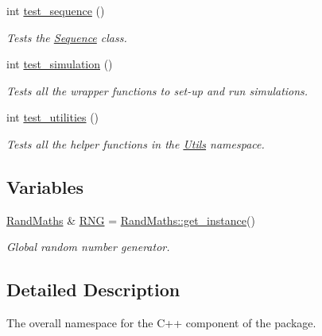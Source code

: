 \begin{DoxyCompactItemize}
int \hyperlink{namespaceretrocombinator_a15194234ee9ebb9f3901e14cf7b77450}{test\+\_\+sequence} ()
\begin{DoxyCompactList}\small\item\em Tests the \hyperlink{classretrocombinator_1_1Sequence}{Sequence} class. \end{DoxyCompactList}\item 
\mbox{\label{namespaceretrocombinator_a48d115c48074ffd5cd46b517a23983ec}} 
int \hyperlink{namespaceretrocombinator_a48d115c48074ffd5cd46b517a23983ec}{test\+\_\+simulation} ()
\begin{DoxyCompactList}\small\item\em Tests all the wrapper functions to set-\/up and run simulations. \end{DoxyCompactList}\item 
\mbox{\label{namespaceretrocombinator_a750d1c81b59d284885ae7141e62229a1}} 
int \hyperlink{namespaceretrocombinator_a750d1c81b59d284885ae7141e62229a1}{test\+\_\+utilities} ()
\begin{DoxyCompactList}\small\item\em Tests all the helper functions in the \hyperlink{namespaceretrocombinator_1_1Utils}{Utils} namespace. \end{DoxyCompactList}\end{DoxyCompactItemize}
\subsection*{Variables}
\begin{DoxyCompactItemize}
\item 
\hyperlink{classretrocombinator_1_1RandMaths}{Rand\+Maths} \& \hyperlink{namespaceretrocombinator_a4987db6a228df9ffab41c0a5342556f6}{R\+NG} = \hyperlink{classretrocombinator_1_1RandMaths_ae54dee1a16fb0e275e1624ccaa7dc87e}{Rand\+Maths\+::get\+\_\+instance}()
\begin{DoxyCompactList}\small\item\em Global random number generator. \end{DoxyCompactList}\end{DoxyCompactItemize}


\subsection{Detailed Description}
The overall namespace for the C++ component of the package. 

